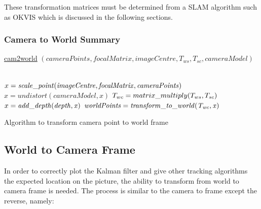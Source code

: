 \documentclass[11pt,twoside]{report}
\begin{document}
These transformation matrices must be determined from a SLAM algorithm such as OKVIS which is discussed in the following sections.

\subsubsection{Camera to World Summary}

\begin{algorithm}
	\DontPrintSemicolon
	\SetAlgoLined
	\underline{cam2world} $(cameraPoints,focalMatrix,imageCentre,T_{ws},T_{sc},cameraModel)$\;
	
	\texttt{\\}
	$x = \mathit{scale\text{\textunderscore}point(imageCentre,focalMatrix,cameraPoints)}$ 
	$x = \mathit{undistort(cameraModel,x)}$ 
	$T_{wc} = matrix\text{\textunderscore}multiply(T_{ws},T_{sc})$
	\texttt{\\}
	$x = \mathit{add\text{\textunderscore}depth(depth,x)}$ 
	$\mathit{worldPoints} = \mathit{transform\text{\textunderscore}to\text{\textunderscore}world(T_{wc},x)}$ 
	\texttt{\\}
	\caption{Algorithm to transform camera point to world frame}
	\label{alg:weights}
\end{algorithm}

\subsection{World to Camera Frame} \label{w_c_frame}

In order to correctly plot the Kalman filter and give other tracking algorithms the expected location on the picture, the ability to transform from world to camera frame is needed. The process is similar to the camera to frame except the reverse, namely:
\end{document}
